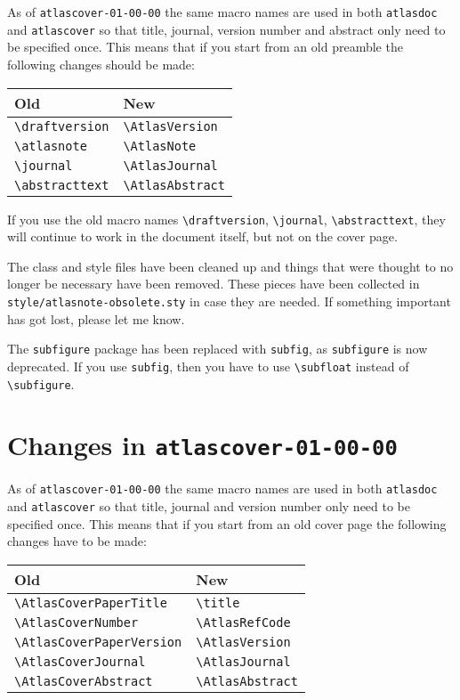 \documentclass[koma,UKenglish]{style/atlasdoc}
\newcommand{\Macro}[1]{\texttt{\textbackslash #1}\xspace}
\begin{document}
As of \texttt{atlascover-01-00-00} the same macro names are used in both \texttt{atlasdoc} and
\texttt{atlascover} so that title, journal, version number and abstract only need to be specified once.
This means that if you start from an old preamble the following changes should be made:
\begin{center}
	\begin{tabular}{ll}
		Old	& New\\
		\midrule
		\Macro{draftversion} & \Macro{AtlasVersion}\\
		\Macro{atlasnote} & \Macro{AtlasNote}\\
		\Macro{journal} & \Macro{AtlasJournal}\\
		\Macro{abstracttext} & \Macro{AtlasAbstract}
	\end{tabular}
\end{center}
If you use the old macro names 
\Macro{draftversion}, \Macro{journal}, \Macro{abstracttext},
they will continue to work in the document itself, but not on the cover page.

The class and style files have been cleaned up and things 
that were thought to no longer be necessary have been removed.
These pieces have been collected in \texttt{style/atlasnote-obsolete.sty} in case they are needed.
If something important has got lost, please let me know.

The \texttt{subfigure} package has been replaced with \texttt{subfig}, as \texttt{subfigure} is now deprecated.
If you use \texttt{subfig}, then you have to use \Macro{subfloat} instead of \Macro{subfigure}.

\section{Changes in \texttt{atlascover-01-00-00}}
\label{sec:oldcover}

As of \texttt{atlascover-01-00-00} the same macro names are used in both \texttt{atlasdoc} and
\texttt{atlascover} so that title, journal and version number only need to be specified once.
This means that if you start from an old cover page the following changes have to be made:
\begin{center}
	\begin{tabular}{ll}
		Old                            & New                   \\
		\midrule
		\Macro{AtlasCoverPaperTitle}   & \Macro{title}    \\
		\Macro{AtlasCoverNumber}       & \Macro{AtlasRefCode}  \\
		\Macro{AtlasCoverPaperVersion} & \Macro{AtlasVersion}  \\
		\Macro{AtlasCoverJournal}      & \Macro{AtlasJournal}  \\
		\Macro{AtlasCoverAbstract}     & \Macro{AtlasAbstract}
	\end{tabular}
\end{center}
\end{document}

